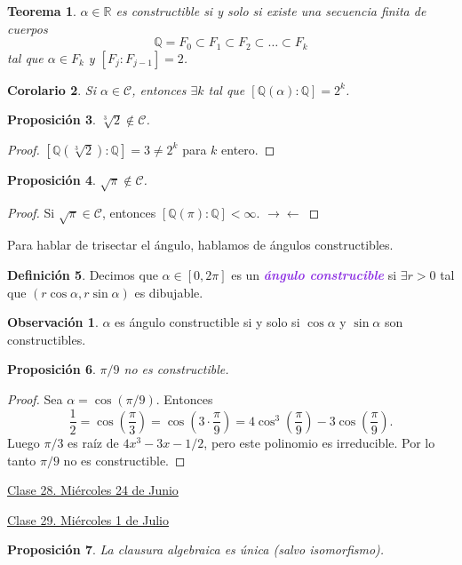 \documentclass{article}
\newtheorem{theorem}{Teorema}[subsection]
\newtheorem{corollary}[theorem]{Corolario}
\newtheorem{proposition}[theorem]{Proposición}
\theoremstyle{definition}
\newtheorem{definition}[theorem]{Definición}
\newtheorem*{obs}{Observación}
\theoremstyle{remark}
\numberwithin{equation}{section}
\newcommand{\Q}{\mathbb{Q}}
\newcommand{\R}{\mathbb{R}}
\newcommand{\Ccal}{\mathcal{C}}
\renewcommand{\a}{\alpha}
\newcommand{\oo}{\infty}
\renewcommand{\c}{\cdot}
\newcommand{\br}[1]{\left( #1 \right)}
\newcommand{\wea}[1]{\textcolor{BlueViolet}{\textbf{\emph{#1}}}}
\newcommand{\fecha}[1]{\begin{flushright} \underline{#1} \end{flushright}}
\begin{document}
\begin{theorem}
  $\a \in \R$ es constructible si y solo si existe una secuencia finita de cuerpos
  \[ \Q = F_0 \subset F_1 \subset F_2 \subset \dots \subset F_k \]
  tal que $\a \in F_k$ y $[F_j : F_{j-1}] = 2$.
\end{theorem}

\begin{corollary}
  Si $\a \in \Ccal$, entonces $\exists k$ tal que $[\Q(\a) : \Q] = 2^k$.
\end{corollary}

\begin{proposition}
  $\sqrt[3]{2} \notin \Ccal$.
\end{proposition}
\begin{proof}
  $[\Q(\sqrt[3]{2}):\Q] = 3 \neq 2^k$ para $k$ entero.
\end{proof}

\begin{proposition}
  $\sqrt\pi \notin \Ccal$.
\end{proposition}
\begin{proof}
  Si $\sqrt\pi \in \Ccal$, entonces $[\Q(\pi) : \Q] < \oo$. \(\to\gets\)
\end{proof}

Para hablar de trisectar el ángulo, hablamos de ángulos constructibles.

\begin{definition}
  Decimos que $\a \in [0,2\pi]$ es un \wea{ángulo construcible} si $\exists r >0$ tal que $(r \cos\a, r \sin\a)$ es dibujable.
\end{definition}

\begin{obs}
  $\a$ es ángulo constructible si y solo si $\cos\a$ y $\sin\a$ son constructibles.
\end{obs}

\begin{proposition}
  $\pi/9$ no es constructible.
\end{proposition}
\begin{proof}
  Sea $\a = \cos(\pi/9)$. Entonces
  \[ \frac{1}{2} = \cos\br{\frac{\pi}{3}} = \cos\br{3 \c \frac{\pi}{9}} = 4 \cos^3\br{\frac{\pi}{9}} - 3 \cos\br{\frac{\pi}{9}}. \]
  Luego $\pi/3$ es raíz de $4x^3 - 3x - 1/2$, pero este polinomio es irreducible. Por lo tanto $\pi/9$ no es constructible.
\end{proof}

\fecha{Clase 28. Miércoles 24 de Junio}

\fecha{Clase 29. Miércoles 1 de Julio}

\begin{proposition}
  La clausura algebraica es única (salvo isomorfismo).
\end{proposition}

\end{document}

